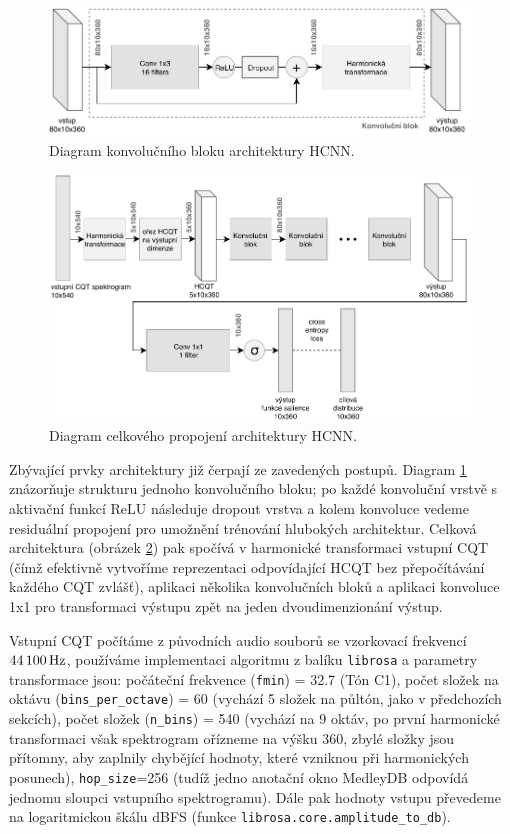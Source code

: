 \begin{figure}[h]\centering
    \includegraphics[width=\textwidth,height=\textheight,keepaspectratio]{../img/hcnn_layer_grey}
\caption{Diagram konvolučního bloku architektury HCNN.}\label{obr:hcnn_layer}
\end{figure}

\begin{figure}[h]\centering
    \includegraphics[width=\textwidth,height=\textheight,keepaspectratio]{../img/hcnn_arch_grey}
\caption{Diagram celkového propojení architektury HCNN.}\label{obr:hcnn_arch}
\end{figure}

Zbývající prvky architektury již čerpají ze zavedených postupů. Diagram \ref{obr:hcnn_layer} znázorňuje strukturu jednoho konvolučního bloku; po každé konvoluční vrstvě s aktivační funkcí ReLU následuje dropout vrstva a kolem konvoluce vedeme residuální propojení pro umožnění trénování hlubokých architektur. Celková architektura (obrázek \ref{obr:hcnn_arch}) pak spočívá v harmonické transformaci vstupní CQT (čímž efektivně vytvoříme reprezentaci odpovídající HCQT bez přepočítávání každého CQT zvlášť), aplikaci několika konvolučních bloků a aplikaci konvoluce 1x1 pro transformaci výstupu zpět na jeden dvoudimenzionání výstup.

Vstupní CQT počítáme z původních audio souborů se vzorkovací frekvencí $44\,100\,\rm Hz$, používáme implementaci algoritmu z balíku \texttt{librosa} a parametry transformace jsou: počáteční frekvence (\texttt{fmin}) = 32.7 (Tón C1), počet složek na oktávu (\texttt{bins\_per\_octave}) = 60 (vychází 5 složek na půltón, jako v předchozích sekcích), počet složek (\texttt{n\_bins}) = 540 (vychází na 9 oktáv, po první harmonické transformaci však spektrogram ořízneme na výšku 360, zbylé složky jsou přítomny, aby zaplnily chybějící hodnoty, které vzniknou při harmonických posunech), \texttt{hop\_size}=256 (tudíž jedno anotační okno MedleyDB odpovídá jednomu sloupci vstupního spektrogramu). Dále pak hodnoty vstupu převedeme na logaritmickou škálu dBFS (funkce \texttt{librosa.core.amplitude\_to\_db}). 

